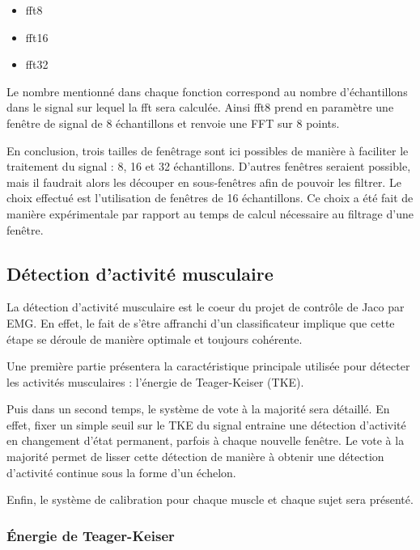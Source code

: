\documentclass[letterpaper, twoside, 12pt, memoire, creativecommons, hyperref]{thETS}
\begin{document}
\begin{itemize}
 \item fft8
 \item fft16
 \item fft32
\end{itemize}

Le nombre mentionné dans chaque fonction correspond au nombre d'échantillons dans le signal sur lequel la fft sera calculée. Ainsi fft8 prend en paramètre une fenêtre de signal de 8 échantillons et renvoie une FFT sur 8 points.

En conclusion, trois tailles de fenêtrage sont ici possibles de manière à faciliter le traitement du signal : 8, 16 et 32 échantillons. D'autres fenêtres seraient possible, mais il faudrait alors les découper en sous-fenêtres afin de pouvoir les filtrer. Le choix effectué est l'utilisation de fenêtres de 16 échantillons. Ce choix a été fait de manière expérimentale par rapport au temps de calcul nécessaire au filtrage d'une fenêtre.

\subsection{Détection d'activité musculaire}\label{CHdetect}

La détection d'activité musculaire est le coeur du projet de contrôle de Jaco par EMG. En effet, le fait de s'être affranchi d'un classificateur implique que cette étape se déroule de manière optimale et toujours cohérente.

Une première partie présentera la caractéristique principale utilisée pour détecter les activités musculaires : l'énergie de Teager-Keiser (TKE). 

Puis dans un second temps, le système de vote à la majorité sera détaillé. En effet, fixer un simple seuil sur le TKE du signal entraine une détection d'activité en changement d'état permanent, parfois à chaque nouvelle fenêtre. Le vote à la majorité permet de lisser cette détection de manière à obtenir une détection d'activité continue sous la forme d'un échelon.

Enfin, le système de calibration pour chaque muscle et chaque sujet sera présenté.

\subsubsection{Énergie de Teager-Keiser}
\label{CHtke}
\end{document}
